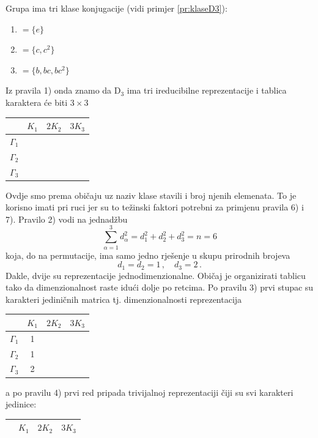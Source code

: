 \begin{primjer}

Grupa ima tri klase konjugacije (vidi primjer \ref{pr:klaseD3}):

\begin{center}
\begin{enumerate}[label=$K_{\mathrm{\arabic{enumi}}}$]
 \item $ = \{e\}$
 \item $ = \{c, c^2\}$
 \item $ =  \{ b, bc, bc^2 \}$
\end{enumerate}
\end{center}

Iz pravila 1) onda znamo da D$_{3}$ ima tri ireducibilne reprezentacije
i tablica karaktera će biti $3 \times 3$
\begin{center}
\begin{tabular}{c|ccc}
  & $K_1$ & $2 K_2$  & $ 3 K_3$ \\ \hline
$\Gamma_1$ &   &  &   \\
$\Gamma_2$ &   &  &   \\
 $\Gamma_3$  &   &  &  
\end{tabular}
\end{center}
Ovdje smo prema običaju uz naziv klase stavili i broj njenih elemenata. To je
korisno imati pri ruci jer su to težinski faktori potrebni za primjenu
pravila 6) i 7).
Pravilo 2) vodi na jednadžbu
 $$\sum_{\alpha=1}^{3} d_{\alpha}^2 = d_{1}^2 + d_{2}^2
   + d_{3}^2 = n = 6 $$
koja, do na permutacije, ima samo jedno rješenje u skupu prirodnih brojeva
 $$ d_1 = d_2 = 1\,,\quad d_3=2 \,. $$
Dakle, dvije su reprezentacije jednodimenzionalne. Običaj je organizirati
tablicu tako da dimenzionalnost raste idući dolje po retcima.
Po pravilu 3) prvi stupac su karakteri jediničnih matrica tj. dimenzionalnosti
reprezentacija
\begin{center}
\begin{tabular}{c|ccc}
  & $K_1$ & $2 K_2$  & $ 3 K_3$ \\ \hline
$\Gamma_1$ & 1 &  &   \\
$\Gamma_2$ & 1 &  &   \\
 $\Gamma_3$  & 2 &  &  
\end{tabular}
\end{center}
a po pravilu 4) prvi red pripada trivijalnoj reprezentaciji čiji su svi karakteri
jedinice:
\begin{center}
\begin{tabular}{c|ccc}
  & $K_1$ & $2 K_2$  & $ 3 K_3$ \\ \hline

\end{tabular}
\end{center}
\end{primjer}
